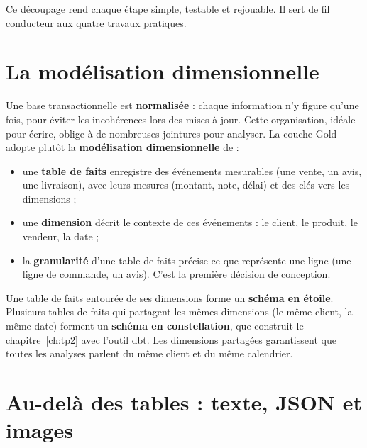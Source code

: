 Ce découpage rend chaque étape simple, testable et rejouable. Il sert de fil conducteur aux quatre
travaux pratiques.

\section{La modélisation dimensionnelle}\label{sec:dimensionnel}

Une base transactionnelle est \textbf{normalisée} : chaque information n'y figure qu'une fois, pour
éviter les incohérences lors des mises à jour. Cette organisation, idéale pour écrire, oblige à de
nombreuses jointures pour analyser. La couche Gold adopte plutôt la \textbf{modélisation
dimensionnelle} de \citet{kimball2013} :
\begin{itemize}[leftmargin=*,itemsep=2pt]
  \item une \textbf{table de faits} enregistre des événements mesurables (une
        vente, un avis, une livraison), avec leurs mesures (montant, note, délai) et des clés vers
        les dimensions ;
  \item une \textbf{dimension} décrit le contexte de ces événements : le client,
        le produit, le vendeur, la date ;
  \item la \textbf{granularité} d'une table de faits précise ce que représente une ligne (une ligne
        de commande, un avis). C'est la première décision de conception.
\end{itemize}

Une table de faits entourée de ses dimensions forme un \textbf{schéma en étoile}. Plusieurs tables de faits qui partagent les mêmes dimensions (le même client, la même date)
forment un \textbf{schéma en constellation}, que construit le
chapitre~\ref{ch:tp2} avec l'outil dbt. Les dimensions partagées garantissent que toutes les
analyses parlent du même client et du même calendrier.

\section{Au-delà des tables : texte, JSON et images}

